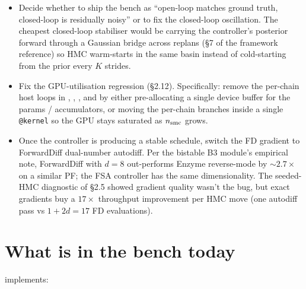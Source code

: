 \documentclass[11pt,a4paper]{article}
\begin{document}
\begin{itemize}[itemsep=2pt,leftmargin=*]
\item Decide whether to ship the bench as ``open-loop matches ground
  truth, closed-loop is residually noisy'' or to fix the closed-loop
  oscillation. The cheapest closed-loop stabiliser would be carrying
  the controller's posterior forward through a Gaussian bridge across
  replans (\S 7 of the framework reference) so HMC warm-starts in the
  same basin instead of cold-starting from the prior every $K$ strides.
\item Fix the GPU-utilisation regression (\S 2.12). Specifically:
  remove the per-chain host loops in
  , ,
  , and 
  by either pre-allocating a single device buffer for the params /
  accumulators, or moving the per-chain branches inside a single
  \texttt{@kernel} so the GPU stays saturated as $n_{\rm smc}$ grows.
\item Once the controller is producing a stable schedule, switch the
  FD gradient to ForwardDiff dual-number autodiff. Per the bistable
  B3 module's empirical note, ForwardDiff with $d=8$ out-performs
  Enzyme reverse-mode by $\sim 2.7\times$ on a similar PF; the FSA
  controller has the same dimensionality. The seeded-HMC diagnostic
  of \S 2.5 showed gradient quality wasn't the bug, but exact gradients
  buy a $17\times$ throughput improvement per HMC move (one autodiff
  pass vs $1+2d=17$ FD evaluations).
\end{itemize}

\section{What is in the bench today}

implements:
\end{document}
